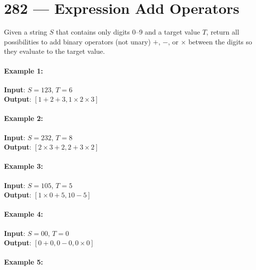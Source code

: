 \section{282 --- Expression Add Operators}
Given a string $S$ that contains only digits 0--9 and a target value $T$, return all possibilities to add binary operators (not unary) $+$, $-$, or $\times$ between the digits so they evaluate to the target value.

\paragraph{Example 1:}

\begin{flushleft}
\textbf{Input}: $S = 123$, $T = 6$
\\
\textbf{Output}: $[1+2+3, 1\times2\times3]$
\end{flushleft} 

\paragraph{Example 2:}

\begin{flushleft}
\textbf{Input}: $S = 232$, $T = 8$
\\
\textbf{Output}: $[2\times3+2, 2+3\times2]$
\end{flushleft}

\paragraph{Example 3:}

\begin{flushleft}
\textbf{Input}: $S = 105$, $T = 5$
\\
\textbf{Output}: $[1\times0+5, 10-5]$
\end{flushleft}

\paragraph{Example 4:}
\begin{flushleft}
\textbf{Input}: $S = 00$, $T = 0$
\\
\textbf{Output}: $[0+0, 0-0, 0\times0]$
\end{flushleft}

\paragraph{Example 5:}

